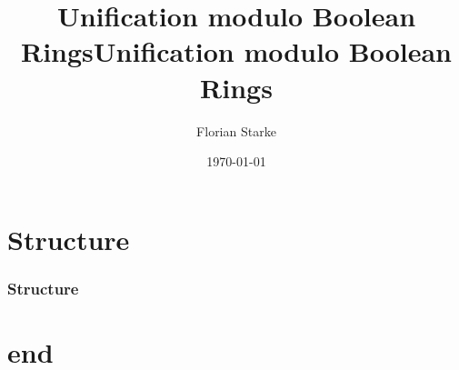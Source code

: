 \documentclass{beamer}
\title{Unification modulo\hspace{30pt} Boolean Rings}
\author{Florian	Starke}
\date{\today}
\begin{document}
\maketitle
\addtocounter{framenumber}{-1}
\title{Unification modulo Boolean Rings}

\section*{Structure}
\begin{frame}
\frametitle{Structure}
\tableofcontents 
\end{frame}
\section*{end}
\end{document}

